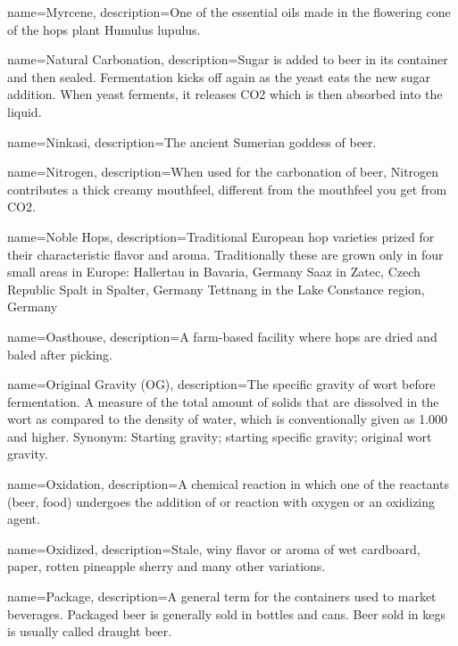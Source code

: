 {
  name={Myrcene},
  description={One of the essential oils made in the flowering cone of the hops plant Humulus lupulus.}
  }

{
  name={Natural Carbonation},
  description={Sugar is added to beer in its container and then sealed. Fermentation kicks off again as the yeast eats the new sugar addition. When yeast ferments, it releases CO2 which is then absorbed into the liquid.}
  }

{
  name={Ninkasi},
  description={The ancient Sumerian goddess of beer.}
  }

{
  name={Nitrogen},
  description={When used for the carbonation of beer, Nitrogen contributes a thick creamy mouthfeel, different from the mouthfeel you get from CO2.}
  }

{
  name={Noble Hops},
  description={Traditional European hop varieties prized for their characteristic flavor and aroma. Traditionally these are grown only in four small areas in Europe: Hallertau in Bavaria, Germany Saaz in Zatec, Czech Republic Spalt in Spalter, Germany Tettnang in the Lake Constance region, Germany}
  }

{
  name={Oasthouse},
  description={A farm-based facility where hops are dried and baled after picking.}
  }

{
  name={Original Gravity (OG)},
  description={The specific gravity of wort before fermentation. A measure of the total amount of solids that are dissolved in the wort as compared to the density of water, which is conventionally given as 1.000 and higher. Synonym: Starting gravity; starting specific gravity; original wort gravity.}
  }

{
  name={Oxidation},
  description={A chemical reaction in which one of the reactants (beer, food) undergoes the addition of or reaction with oxygen or an oxidizing agent.}
  }

{
  name={Oxidized},
  description={Stale, winy flavor or aroma of wet cardboard, paper, rotten pineapple sherry and many other variations.}
  }

{
  name={Package},
  description={A general term for the containers used to market beverages. Packaged beer is generally sold in bottles and cans. Beer sold in kegs is usually called draught beer.}
  }

